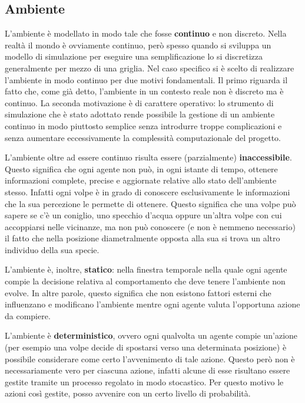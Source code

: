 \documentclass[11pt]{article}
\begin{document}
\subsection{Ambiente}
L'ambiente è modellato in modo tale che fosse \textbf{continuo} e non discreto. Nella realtà il mondo è ovviamente continuo, però spesso quando si sviluppa un modello di simulazione per eseguire una semplificazione lo si discretizza generalmente per mezzo di una griglia. Nel caso specifico si è scelto di realizzare l'ambiente in modo continuo per due motivi fondamentali. Il primo riguarda il fatto che, come già detto, l'ambiente in un contesto reale non è discreto ma è continuo. La seconda motivazione è di carattere operativo: lo strumento di simulazione che è stato adottato rende possibile la gestione di un ambiente continuo in modo piuttosto semplice senza introdurre troppe complicazioni e senza aumentare eccessivamente la complessità computazionale del progetto. 

L'ambiente oltre ad essere continuo risulta essere (parzialmente) \textbf{inaccessibile}. Questo significa che ogni agente non può, in ogni istante di tempo, ottenere informazioni complete, precise e aggiornate relative allo stato dell'ambiente stesso. Infatti ogni volpe è in grado di conoscere esclusivamente le informazioni che la sua percezione le permette di ottenere. Questo significa che una volpe può sapere se c'è un coniglio, uno specchio d'acqua oppure un'altra volpe con cui accoppiarsi nelle vicinanze, ma non può conoscere (e non è nemmeno necessario) il fatto che nella posizione diametralmente opposta alla sua si trova un altro individuo della sua specie. 

L'ambiente è, inoltre, \textbf{statico}: nella finestra temporale nella quale ogni agente compie la decisione relativa al comportamento che deve tenere l'ambiente non evolve. In altre parole, questo significa che non esistono fattori esterni che influenzano e modificano l'ambiente mentre ogni agente valuta l'opportuna azione da compiere. 

L'ambiente è \textbf{deterministico}, ovvero ogni qualvolta un agente compie un'azione (per esempio una volpe decide di spostarsi verso una determinata posizione) è possibile considerare come certo l'avvenimento di tale azione. Questo però non è necessariamente vero per ciascuna azione, infatti alcune di esse risultano essere gestite tramite un processo regolato in modo stocastico. Per questo motivo le azioni così gestite, posso avvenire con un certo livello di probabilità.
\end{document}
